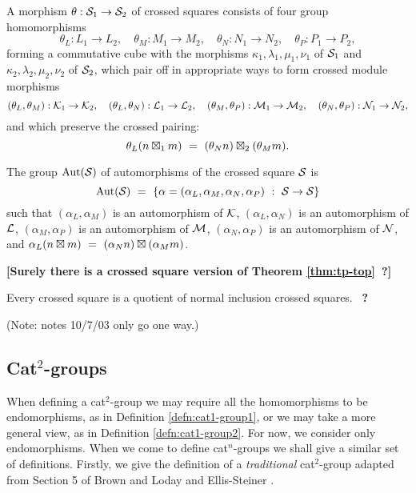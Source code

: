 \begin{defn}
A morphism $\theta : \mathcal{S}_1 \to \mathcal{S}_2$ of crossed squares
consists of four group homomorphisms
$$
\theta_L : L_1 \to L_2, \quad
\theta_M : M_1 \to M_2, \quad
\theta_N : N_1 \to N_2, \quad
\theta_P : P_1 \to P_2,
$$
forming a commutative cube with the morphisms 
$\kappa_1, \lambda_1, \mu_1, \nu_1$ of $\mathcal{S}_1$
and $\kappa_2, \lambda_2, \mu_2, \nu_2$ of $\mathcal{S}_2$,
which pair off in appropriate ways to form crossed module morphisms
$$
(\theta_L,\theta_M) : \mathcal{K}_1 \to \mathcal{K}_2, \quad
(\theta_L,\theta_N) : \mathcal{L}_1 \to \mathcal{L}_2, \quad
(\theta_M,\theta_P) : \mathcal{M}_1 \to \mathcal{M}_2, \quad
(\theta_N,\theta_P) : \mathcal{N}_1 \to \mathcal{N}_2,
$$
and which preserve the crossed pairing: 
$$
\theta_L(n \boxtimes_1 m) ~=~ 
(\theta_N n) \boxtimes_2 (\theta_M m).
$$
\end{defn}

\begin{defn} \label{def:aut-xsq} 
The group $\mathrm{Aut}(\mathcal{S})$ of automorphisms of the crossed square $\mathcal{S}$ is 
$$
\mathrm{Aut}(\mathcal{S}) ~=~ \{ \alpha = 
(\alpha_L, \alpha_M, \alpha_N, \alpha_P) ~:~ \mathcal{S} \to \mathcal{S} \}
$$ 
such that 
$(\alpha_L, \alpha_M) $  is an automorphism of  $\mathcal{K}$,
$(\alpha_L, \alpha_N) $  is an automorphism of  $\mathcal{L}$,
$(\alpha_M, \alpha_P) $  is an automorphism of  $\mathcal{M}$, 
$(\alpha_N, \alpha_P) $  is an automorphism of  $\mathcal{N}$, and 
$\alpha_L(n \boxtimes m) ~=~ (\alpha_N n) \boxtimes (\alpha_M m)$. 
\end{defn}

\vspace*{15mm}
\noindent
{\bf [Surely there is a crossed square version of Theorem \ref{thm:tp-top}~?]}

\begin{thm}
Every crossed square is a quotient of normal inclusion crossed squares.~ 
{\bf ?}
\end{thm}

\noindent
(Note: notes 10/7/03 only go one way.)


\newpage
\subsection{Cat$^2$-groups}  \label{subs:cattwo}

When defining a cat$^2$-group we may require all the homomorphisms to be 
endomorphisms, as in Definition \ref{defn:cat1-group1}, 
or we may take a more general view, as in Definition \ref{defn:cat1-group2}. 
For now, we consider only endomorphisms.  
When we come to define cat$^n$-groups we shall give a similar set of definitions. 
Firstly, we give the definition of a \emph{traditional} cat$^2$-group adapted from 
Section 5 of Brown and Loday \cite{brow:lod} and Ellis-Steiner \cite{ell:st}.

